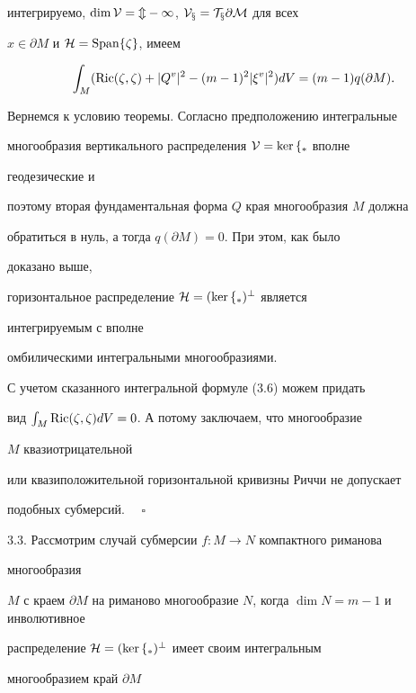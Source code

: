 интегрируемо, $\dim\cal V=m-1$, $\cal V_x=T_x \partial M$ для всех 


$x\in\partial M$ и $\cal H=\operatorname{Span}\{\zeta\}$, имеем 


\begin{equation} 


\int_M(\Ric(\zeta,\zeta)+|Q^v|^2-(m-1)^2|\xi^v|^2)dV= 


(m-1)q(\partial M). 


\end{equation} 


 


Вернемся к условию теоремы. Согласно предположению интегральные 


многообразия вертикального распределения $\cal V=\ker f_*$ вполне 


геодезические и 


поэтому вторая фундаментальная форма $Q$ края многообразия $M$ должна 


обратиться в нуль, а тогда $q(\partial M)=0$. При этом, как было 


доказано выше, 


горизонтальное распределение $\cal H=(\ker f_*)^\bot$ является 


интегрируемым с вполне 


омбилическими интегральными многообразиями. 


 


С учетом сказанного интегральной формуле (3.6) можем придать 


вид $\int_M\operatorname{Ric}(\zeta,\zeta)dV=0$. А потому заключаем, что многообразие 


$M$ квазиотрицательной 


или квазиположительной горизонтальной кривизны Риччи не допускает 


подобных субмерсий. $\quad\square$


\medskip 


 


3.3. Рассмотрим случай субмерсии $f:M\to N$ компактного риманова 


многообразия 


$M$ с краем $\partial M$ на риманово многообразие $N$, когда $\dim 


N=m-1$ и инволютивное 


распределение $\cal H=(\ker f_*)^\bot$ имеет своим интегральным 


многообразием край $\partial M$ 


